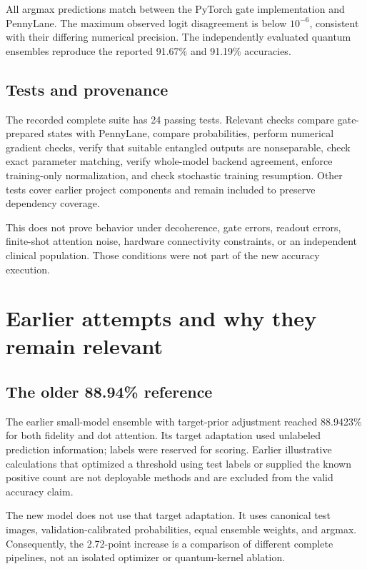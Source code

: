 \documentclass[11pt,a4paper]{report}
\begin{document}
All argmax predictions match between the PyTorch gate implementation and PennyLane. The maximum observed logit disagreement is below $10^{-6}$, consistent with their differing numerical precision. The independently evaluated quantum ensembles reproduce the reported 91.67\% and 91.19\% accuracies.

\section{Tests and provenance}
The recorded complete suite has 24 passing tests. Relevant checks compare gate-prepared states with PennyLane, compare probabilities, perform numerical gradient checks, verify that suitable entangled outputs are nonseparable, check exact parameter matching, verify whole-model backend agreement, enforce training-only normalization, and check stochastic training resumption. Other tests cover earlier project components and remain included to preserve dependency coverage.

This does not prove behavior under decoherence, gate errors, readout errors, finite-shot attention noise, hardware connectivity constraints, or an independent clinical population. Those conditions were not part of the new accuracy execution.

\chapter{Earlier attempts and why they remain relevant}
\section{The older 88.94\% reference}
The earlier small-model ensemble with target-prior adjustment reached 88.9423\% for both fidelity and dot attention. Its target adaptation used unlabeled prediction information; labels were reserved for scoring. Earlier illustrative calculations that optimized a threshold using test labels or supplied the known positive count are not deployable methods and are excluded from the valid accuracy claim.

The new model does not use that target adaptation. It uses canonical test images, validation-calibrated probabilities, equal ensemble weights, and argmax. Consequently, the 2.72-point increase is a comparison of different complete pipelines, not an isolated optimizer or quantum-kernel ablation.
\end{document}
